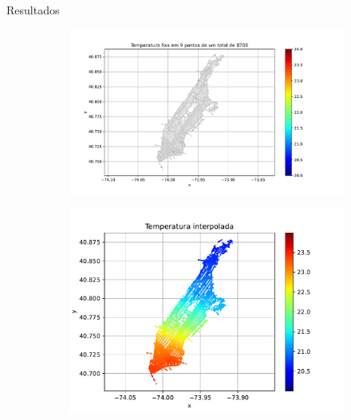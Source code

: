 \documentclass[11pt]{beamer}
\begin{document}
\begin{frame}{Resultados}
    \begin{figure}[htb]
        \hspace{-1cm}
        \begin{subfigure}{0.4\textwidth}
            \label{fig:fixos_9pontos}
            \centering
            \includegraphics[height=0.95\textwidth]{../figs/fig4.pdf}
        \end{subfigure}
        \hspace{1.9cm}
        \begin{subfigure}{0.4\textwidth}
            \label{fig:interpolado_9pontos}
            \centering
            \includegraphics[height=0.95\textwidth]{../figs/fig7.pdf}
        \end{subfigure}
    \end{figure}
\end{frame}
\end{document}
